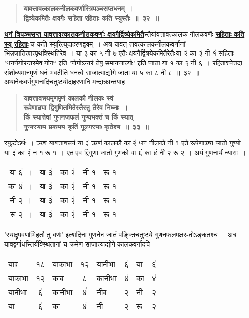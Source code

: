 \documentclass[11pt, openany]{book}
\begin{document}
\newpage

\begin{sloppypar}
 \label{3.32}
\begin{quote}
{\large \textbf{{\color{purple}यावत्तावत्कालकनीलकवर्णास्त्रिपञ्चसप्तधनम्~।\\
द्वित्र्येकमितैः क्षयगैः सहिता रहिताः कति स्युस्तैः~॥~३२~॥}}}
\end{quote}

\hyperref[3.32]{\textbf{धनं त्रिपञ्चसप्त यावत्तावत्कालकनीलकवर्णाः क्षयगैर्द्वित्र्येकमितै}}स्तैर्यावत्तावत्कालक-नीलकवर्णैः \hyperref[3.32]{\textbf{सहिताः कति स्यू रहिताः}} च कति स्युरित्युदाहरणद्वयम्~। अत्र यावत् तावत्कालकनीलकवर्णानां भिन्नजातित्वात्पृथक्स्थितिरेव~। या ३ का ५ नी ७ एतैः क्षयगैर्द्वित्रयेकमितैरेतैः\textendash \,या २ं का ३ं नी १ं सहिताः \hyperref[1.3]{'धनर्णयोरन्तरमेव योगः'} इति \hyperref[3.22]{'योगोऽन्तरं तेषु समानजात्योः'} इति जाता या १ का २ नी ६~। रहिताश्चेत्तदा संशोध्यमानमृणं धनं भवतीति धनत्वे साजात्याद्योगे जाता या ५ का ८ नी ८~॥~३२~॥\\

{\small अथानेकवर्णगुणनादिचतुष्टयोदाहरणानि मन्दाक्रान्तयाह\textendash }

 \label{3.33}
\begin{quote}
{\large \textbf{{\color{purple}यावत्तावत्त्रयमृणमृणं कालकौ नीलकः स्वं \\
रूपेणाढ्या द्विगुणितमितैस्तैस्तु तैरेव निघ्नाः~।\\
किं स्यात्तेषां गुणनजफलं गुण्यभक्तं च किं स्यात्\\
गुण्यस्याथ प्रकथय कृतिं मूलमस्याः कृतेश्च~॥~३३~॥ }}}
\end{quote}

स्फुटोऽर्थः~। ऋणं यावत्तावत्त्रयं या ३ं ऋणं कालकौ का २ं धनं नीलको नी १ एते रूपेणाढ्या जातो गुण्यो या ३ं का २ं न १ रू १~। एत एव द्विगुणा जातो गुणको या ६ं का ४ं नी २ रू २~। अयं गुणनार्थं न्यासः~।

\begin{center}
\begin{tabular}{rllll}
या ६ं~। & या ३ं & का २ं & नी १ & रू १ \\
का ४ं~। & या ३ं & का २ं & नी १ & रू १ \\
नी २~। & या ३ं & का २ं & नी १ & रू १ \\
रू २~। & या ३ं & का २ं & नी १ & रू १ 
\end{tabular}
\end{center}

\noindent \hyperref[3.26]{'स्याद्रूपवर्णाभिहतौ तु वर्णः'} इत्यादिना गुणनेन जातं पङ्क्तिचतुष्टये गुणनफलमक्षर-तोऽङ्कतश्च~। अत्र यावद्वर्गाधस्तिर्यक्स्थितानां च क्रमेण साजात्याद्योगे कालकवर्गादपि

\begin{center}
\begin{tabular}{lclclclc}
याव  & १८ & याकाभा & १२ & यानीभा & ६ं & या & ६ं\\
याकाभा & १२ & काव & ८ & कानीभा & ४ं & का & ४ं\\
यानीभा & ६ं & कानीभा & ४ंं & नीव & २ & नी & २\\
या & ६ं & का & ४ं & नी & २ & रू & २
\end{tabular}
\end{center}
\end{sloppypar}
\end{document}
